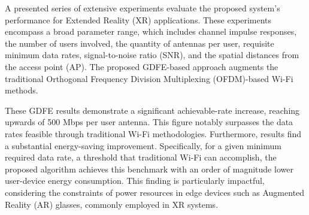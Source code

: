 A presented series of extensive experiments evaluate the proposed system's performance for Extended Reality (XR) applications. These experiments encompass a broad parameter range, which includes channel impulse responses, the number of users involved, the quantity of antennas per user, requisite minimum data rates, signal-to-noise ratio (SNR), and the spatial distances from the access point (AP).  The proposed GDFE-based approach augments the traditional Orthogonal Frequency Division Multiplexing (OFDM)-based Wi-Fi methods.

These GDFE results demonstrate a significant achievable-rate increase, reaching upwards of 500 Mbps per user antenna. This figure notably surpasses the data rates feasible through traditional Wi-Fi methodologies. Furthermore, results find a substantial energy-saving improvement. Specifically, for a given minimum required data rate, a threshold that traditional Wi-Fi can accomplish, the proposed algorithm achieves this benchmark with an order of magnitude lower user-device energy consumption. This finding is particularly impactful, considering the constraints of power resources in edge devices such as Augmented Reality (AR) glasses, commonly employed in XR systems. 
